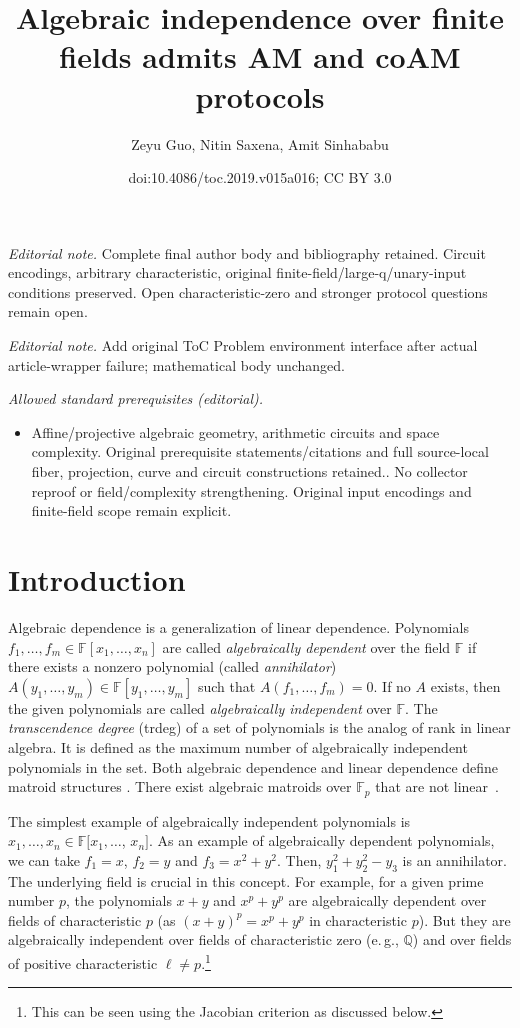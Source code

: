 \documentclass[11pt]{article}
\title{Algebraic independence over finite fields admits AM and coAM protocols}
\author{Zeyu Guo, Nitin Saxena, Amit Sinhababu}
\date{doi:10.4086/toc.2019.v015a016; CC BY 3.0}
\numberwithin{equation}{section}
\theoremstyle{definition}
\theoremstyle{plain}
\newcommand{\eg}{e.\,g.}
\newcommand{\F}{\mathbb{F}}
\begin{document}
\maketitle
\noindent\textit{Editorial note.} Complete final author body and bibliography retained. Circuit encodings, arbitrary characteristic, original finite-field/large-q/unary-input conditions preserved. Open characteristic-zero and stronger protocol questions remain open.\par\medskip
\noindent\textit{Editorial note.} Add original ToC Problem environment interface after actual article-wrapper failure; mathematical body unchanged.\par\medskip
\noindent\textit{Allowed standard prerequisites (editorial).}\begin{itemize}
\item Affine/projective algebraic geometry, arithmetic circuits and space complexity. Original prerequisite statements/citations and full source-local fiber, projection, curve and circuit constructions retained.. No collector reproof or field/complexity strengthening. Original input encodings and finite-field scope remain explicit.
\end{itemize}\medskip
\section{Introduction}
%

Algebraic dependence is a generalization of linear dependence. Polynomials $f_1,\ldots ,f_m \in \F[x_1, \ldots ,x_n]$ are called \emph{algebraically dependent} over
the  %
field $\F$ if there exists a nonzero polynomial (called \emph{annihilator}) $A(y_1,\ldots ,y_m)\in \F[y_1,\ldots ,y_m]$ such that $A(f_1,\ldots,f_m)=0$. If no $A$ exists, then the given polynomials are called \emph{algebraically independent} over $\F$. The \emph{transcendence degree} (trdeg) of a set of polynomials is the analog of rank in linear algebra. It is defined as the
%
maximum   %
number of algebraically independent polynomials in the set. Both algebraic dependence and linear dependence
%
%
define matroid structures  %
\cite{ehrenborg1993apolarity}.
%
There exist algebraic matroids over $\F_p$ that are not
linear~\cite{ingleton1971representation}.   %

The simplest
%
example
of algebraically independent polynomials
%
is
$x_1,\ldots,x_n \in \F[x_1, \ldots$, $x_n] $. As an example of algebraically dependent polynomials, we can take $f_1=x$, $f_2=y$ and $f_3=x^2+y^2$. Then, $y_1^2 + y_2^2-y_3$ is an annihilator. The underlying field is crucial in this concept.
%
For example, for a given prime number $p$, the polynomials $x+y$ and $x^p + y^p$ are algebraically dependent over fields of characteristic $p$ (as $(x+y)^p=x^p+y^p$ in characteristic $p$).
But they are algebraically independent over fields of characteristic zero (\eg, $\mathbb{Q}$) %
and over fields of positive characteristic $\ell\neq p$.\footnote{This can be seen using the Jacobian criterion \cite{Jac41, BMS13} as discussed below.} %
\end{document}
